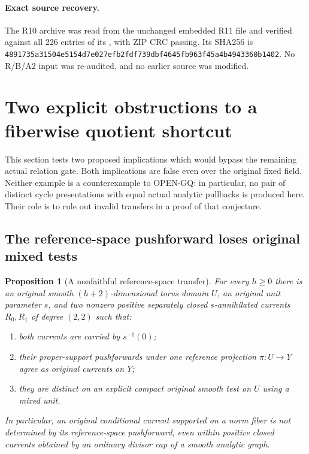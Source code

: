 \documentclass[11pt,a4paper]{article}
\numberwithin{equation}{section}
\newtheorem{proposition}[theorem]{Proposition}
\theoremstyle{definition}
\theoremstyle{remark}
\begin{document}
\paragraph{Exact source recovery.}
The R10 archive was read from the unchanged embedded R11 file and
verified against all 226 entries of its , with
ZIP CRC passing. Its SHA256 is
{\small\nolinkurl{4891735a31504e5154d7e027efb2fdf739dbf4645fb963f45a4b4943360b1402}}.
No R/B/A2 input was re-audited, and no earlier source was modified.



\section{Two explicit obstructions to a fiberwise quotient shortcut}
\label{sec:r12-original-fiber-transfer-obstructions}

This section tests two proposed implications which would bypass
the remaining actual relation gate. Both implications are false
even over the original fixed field. Neither example is a
counterexample to OPEN-GQ: in particular, no pair of distinct
cycle presentations with equal actual analytic pullbacks is
produced here. Their role is to rule out invalid transfers in a
proof of that conjecture.

\subsection{The reference-space pushforward loses original mixed tests}

\begin{proposition}[A nonfaithful reference-space transfer]
\label{prop:r12-nonfaithful-reference-pushforward}
For every $h\ge0$ there is an original smooth $(h+2)$-dimensional
torus domain $U$, an original unit parameter $s$, and two nonzero
positive separately closed $s$-annihilated currents $R_0,R_1$ of
degree $(2,2)$ such that:
\begin{enumerate}
\item both currents are carried by $s^{-1}(0)$;
\item their proper-support pushforwards under one reference
projection $\pi:U\to Y$ agree as original currents on $Y$;
\item they are distinct on an explicit compact original smooth
test on $U$ using a mixed unit.
\end{enumerate}
In particular, an original conditional current supported on a
norm fiber is not determined by its reference-space pushforward,
even within positive closed currents obtained by an ordinary
divisor cap of a smooth analytic graph.
\end{proposition}
\end{document}
